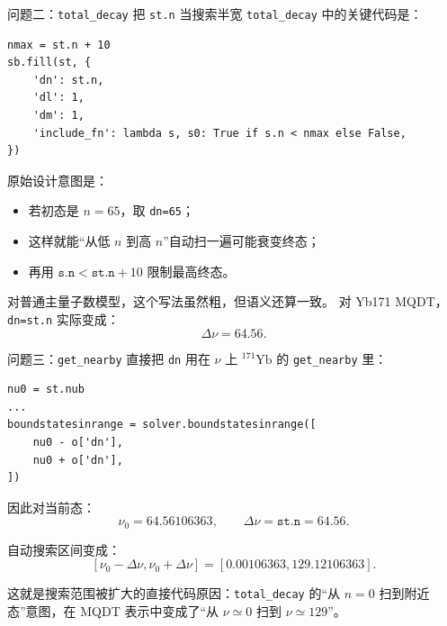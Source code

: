 \documentclass[aspectratio=169,11pt]{ctexbeamer}
\begin{document}
\begin{frame}[fragile]{问题二：\texttt{total\_decay} 把 \texttt{st.n} 当搜索半宽}
  \scriptsize
  \texttt{total\_decay} 中的关键代码是：
  \begin{verbatim}
nmax = st.n + 10
sb.fill(st, {
    'dn': st.n,
    'dl': 1,
    'dm': 1,
    'include_fn': lambda s, s0: True if s.n < nmax else False,
})
  \end{verbatim}

  原始设计意图是：
  \begin{itemize}
    \item 若初态是 \(n=65\)，取 \texttt{dn=65}；
    \item 这样就能“从低 \(n\) 到高 \(n\)”自动扫一遍可能衰变终态；
    \item 再用 \(\texttt{s.n}<\texttt{st.n}+10\) 限制最高终态。
  \end{itemize}

  对普通主量子数模型，这个写法虽然粗，但语义还算一致。
  对 Yb171 MQDT，\texttt{dn=st.n} 实际变成：
  \[
    \Delta\nu = 64.56.
  \]
\end{frame}

\begin{frame}[fragile]{问题三：\texttt{get\_nearby} 直接把 \texttt{dn} 用在 \(\nu\) 上}
  \small
  \({}^{171}\mathrm{Yb}\) 的 \texttt{get\_nearby} 里：
  \begin{verbatim}
nu0 = st.nub
...
boundstatesinrange = solver.boundstatesinrange([
    nu0 - o['dn'],
    nu0 + o['dn'],
])
  \end{verbatim}

  因此对当前态：
  \[
    \nu_0=64.56106363,
    \qquad
    \Delta\nu=\texttt{st.n}=64.56.
  \]

  自动搜索区间变成：
  \[
    [\nu_0-\Delta\nu,\nu_0+\Delta\nu]
    =
    [0.00106363,129.12106363].
  \]

  这就是搜索范围被扩大的直接代码原因：\texttt{total\_decay} 的“从 \(n=0\) 扫到附近态”意图，在 MQDT 表示中变成了“从 \(\nu\simeq0\) 扫到 \(\nu\simeq129\)”。
\end{frame}
\end{document}
